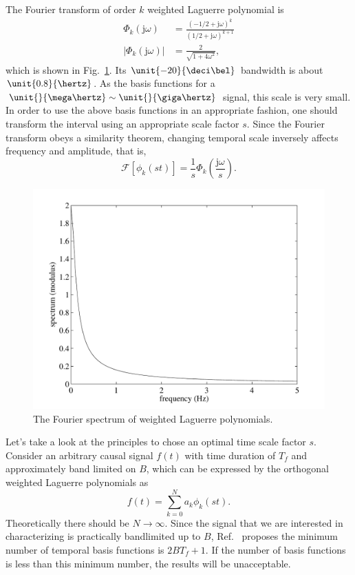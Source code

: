 \documentclass[conference, a4paper]{IEEEtran}
\begin{document}
The Fourier transform of order $k$ weighted Laguerre polynomial is
\begin{equation}
\begin{split}
\Phi_k(\mathrm{j}\omega)&=\frac{(-1/2+\mathrm{j}\omega)^k}{(1/2+\mathrm{j}\omega)^{k+1}}\\
\lvert{\Phi_k(\mathrm{j}\omega)}\rvert&=\frac{2}{\sqrt{1+4\omega^2}},
\end{split}
\end{equation}
which is shown in Fig.~\ref{fig1}. Its $\unit{-20}{\deci\bel}$
bandwidth is about $\unit{0.8}{\hertz}$. As the basis functions for a
$\unit{}{\mega\hertz}\sim\unit{}{\giga\hertz}$ signal, this scale is very
small. In order to use the above basis functions in an appropriate
fashion, one should transform the interval using an appropriate scale
factor $s$. Since the Fourier transform obeys a similarity theorem,
changing temporal scale inversely affects frequency and amplitude, that is,
\begin{equation}
\mathscr{F}[\phi_k(st)]=\frac{1}{s}\Phi_k(\frac{\mathrm{j}\omega}{s}).
\end{equation}
\begin{figure}
    \centering
    \includegraphics[scale=0.48]{lagu.pdf}
    \caption{The Fourier spectrum of weighted Laguerre polynomials.}
    \label{fig1}
\end{figure}

Let's take a look at the principles to chose an optimal time scale factor
$s$. Consider an arbitrary causal signal $f(t)$ with time duration of $T_f$
and approximately band limited on $B$, which can be expressed by the
orthogonal weighted Laguerre polynomials as
\begin{equation}
f(t)=\sum_{k=0}^{N}a_k\phi_k(st).
\end{equation}
Theoretically there should be $N\rightarrow\infty$. Since the signal that
we are interested in characterizing is practically bandlimited up to
$B$, Ref.~\cite{jung:time:2003} proposes the minimum number of temporal basis
functions is $2BT_f+1$. If the number of basis functions is less than
this minimum number, the results will be unacceptable.
\end{document}
